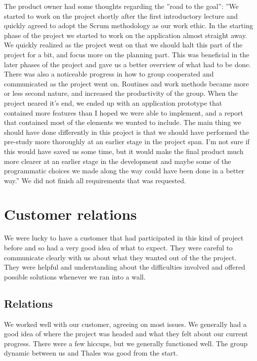 The product owner had some thoughts regarding the ''road to the goal'':
\newline
\newline
''We started to work on the project shortly after the first introductory lecture and quickly agreed to adopt the Scrum methodology as our work ethic. In the starting phase of the project we started to work on the application almost straight away. We quickly realized as the project went on that we should halt this part of the project for a bit, and focus more on the planning part. This was beneficial in the later phases of the project and gave us a better overview of what had to be done.
There was also a noticeable progress in how to group cooperated and communicated as the project went on. Routines and work methods became more or less second nature, and increased the productivity of the group. When the project neared it’s end, we ended up with an application prototype that contained more features than I hoped we were able to implement, and a report that contained most of the elements we wanted to include.
\newline
\newline
The main thing we should have done differently in this project is that we should have performed the pre-study more thoroughly at an earlier stage in the project span. I’m not sure if this would have saved us some time, but it would make the final product much more clearer at an earlier stage in the development and maybe some of the programmatic choices we made along the way could have been done in a better way.''
\newline
\newline
We did not finish all requirements that was requested.  

\section{Customer relations}\label{sec:refl_customer}
We were lucky to have a customer that had participated in this kind of project before and so had a very good idea of what to expect. They were careful to communicate clearly with us about what they wanted out of the the project. They were helpful and understanding about the difficulties involved and offered possible solutions whenever we ran into a wall.
\subsection{Relations}
We worked well with our customer, agreeing on most issues. We generally had a good idea of where the project was headed and what they felt about our current progress. There were a few hiccups, but we generally functioned well. The group dynamic between us and Thales was good from the start.

